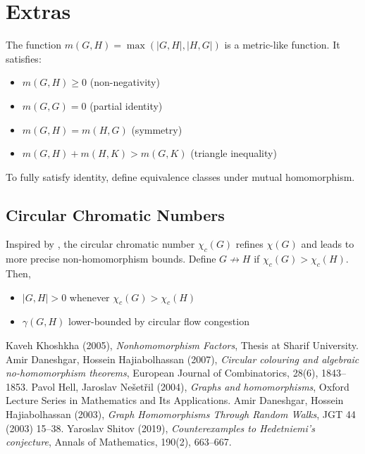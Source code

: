 \documentclass[11pt]{article}
\begin{document}
\section{Extras}
The function $m(G,H) = \max(|G,H|,|H,G|)$ is a metric-like function. It satisfies:
\begin{itemize}
  \item $m(G,H) \geq 0$ (non-negativity)
  \item $m(G,G) = 0$ (partial identity)
  \item $m(G,H) = m(H,G)$ (symmetry)
  \item $m(G,H) + m(H,K) > m(G,K)$ (triangle inequality)
\end{itemize}

To fully satisfy identity, define equivalence classes under mutual homomorphism.




\subsection{Circular Chromatic Numbers}
Inspired by \cite{daneshgar}, the circular chromatic number $\chi_c(G)$ refines $\chi(G)$ and leads to more precise non-homomorphism bounds. Define $G \not\rightarrow H$ if $\chi_c(G) > \chi_c(H)$. Then,
\begin{itemize}
  \item $|G,H| > 0$ whenever $\chi_c(G) > \chi_c(H)$
  \item $\gamma(G,H)$ lower-bounded by circular flow congestion
\end{itemize}


\begin{thebibliography}{9}
 Kaveh Khoshkha (2005), \emph{Nonhomomorphism Factors}, Thesis at Sharif University.
 Amir Daneshgar, Hossein Hajiabolhassan (2007), \emph{Circular colouring and algebraic no-homomorphism theorems}, European Journal of Combinatorics, 28(6), 1843–1853.
 Pavol Hell, Jaroslav Nešetřil (2004), \emph{Graphs and homomorphisms}, Oxford Lecture Series in Mathematics and Its Applications.
 Amir Daneshgar, Hossein Hajiabolhassan (2003), \emph{Graph Homomorphisms Through Random Walks}, JGT 44 (2003) 15–38.
 Yaroslav Shitov (2019), \emph{Counterexamples to Hedetniemi’s conjecture}, Annals of Mathematics, 190(2), 663–667.
\end{thebibliography}
\end{document}

